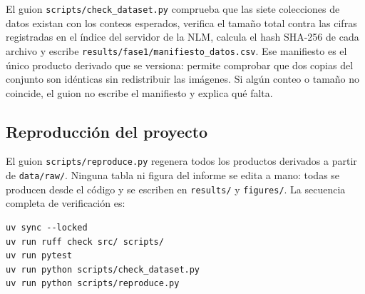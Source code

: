 \documentclass[12pt,a4paper]{article}
\begin{document}
El guion \texttt{scripts/check\_dataset.py} comprueba que las siete colecciones
de datos existan con los conteos esperados, verifica el tamaño total contra las
cifras registradas en el índice del servidor de la NLM, calcula el hash SHA-256
de cada archivo y escribe \texttt{results/fase1/manifiesto\_datos.csv}. Ese
manifiesto es el único producto derivado que se versiona: permite comprobar que
dos copias del conjunto son idénticas sin redistribuir las imágenes. Si algún
conteo o tamaño no coincide, el guion no escribe el manifiesto y explica qué
falta.

\subsection{Reproducción del proyecto}

El guion \texttt{scripts/reproduce.py} regenera todos los productos derivados a
partir de \texttt{data/raw/}. Ninguna tabla ni figura del informe se edita a
mano: todas se producen desde el código y se escriben en \texttt{results/} y
\texttt{figures/}. La secuencia completa de verificación es:

\begin{verbatim}
uv sync --locked
uv run ruff check src/ scripts/
uv run pytest
uv run python scripts/check_dataset.py
uv run python scripts/reproduce.py
\end{verbatim}



\nocite{*}


\end{document}
